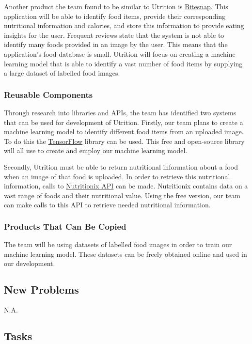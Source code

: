 \documentclass[12pt]{article}
\begin{document}
{Another product the team found to be similar to Utrition is \href{https://play.google.com/store/apps/details?id=ai.bite.biteapp&hl=en_US&gl=US}{Bitesnap}. This application will be able to identify food items, provide their corresponding nutritional information and calories, and store this information to provide eating insights for the user. Frequent reviews state that the system is not able to identify many foods provided in an image by the user. This means that the application's food database is small. Utrition will focus on creating a machine learning model that is able to identify a vast number of food items by supplying a large dataset of labelled food images. 

\subsubsection{Reusable Components}
Through research into libraries and APIs, the team has identified two systems that can be used for development of Utrition. Firstly, our team plans to create a machine learning model to identify different food items from an uploaded image. To do this the \href{https://www.tensorflow.org/}{TensorFlow} library can be used. This free and open-source library will all use to create and employ our machine learning model.

Secondly, Utrition must be able to return nutritional information about a food when an image of that food is uploaded. In order to retrieve this nutritional information, calls to \href{https://www.nutritionix.com/business/api}{Nutritionix API} can be made. Nutritionix contains data on a vast range of foods and their nutritional value. Using the free version, our team can make calls to this API to retrieve needed nutritional information.

\subsubsection{Products That Can Be Copied}
The team will be using datasets of labelled food images in order to train our machine learning model. These datasets can be freely obtained online and used in our development.

\subsection{New Problems}
N.A.

\subsection{Tasks}
}
\end{document}
